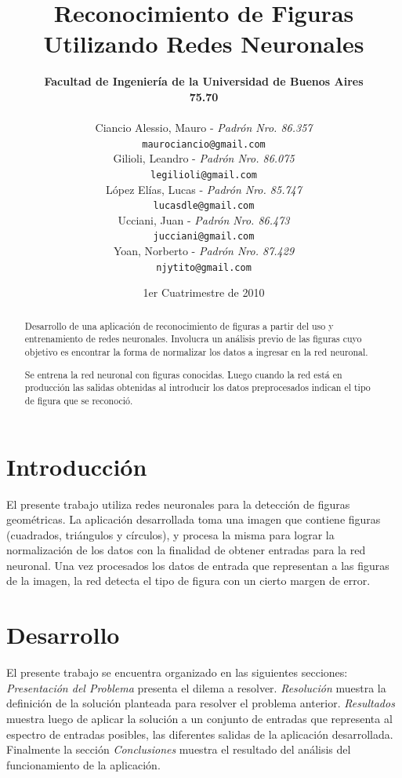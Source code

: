 \documentclass[pdftex,a4paper,12pt]{article}
\title{Reconocimiento de Figuras Utilizando Redes Neuronales}
\author{ \textbf{Facultad de Ingenier\'ia de la Universidad de Buenos Aires}\\
\textbf{75.70} \\ \\ 
Ciancio Alessio, Mauro - \textit{Padr\'on Nro. 86.357} \\
\texttt{maurociancio@gmail.com} \\
Gilioli, Leandro - \textit{Padr\'on Nro. 86.075} \\
\texttt{legilioli@gmail.com} \\
L\'opez El\'ias, Lucas - \textit{Padr\'on Nro. 85.747} \\
\texttt{lucasdle@gmail.com} \\
Ucciani, Juan - \textit{Padr\'on Nro. 86.473} \\
\texttt{jucciani@gmail.com} \\
Yoan, Norberto - \textit{Padr\'on Nro. 87.429} \\
\texttt{njytito@gmail.com} \\[2.5ex]
}
\date{1er Cuatrimestre de 2010}
\begin{document}
\maketitle

\begin{abstract}
	Desarrollo de una aplicaci\'on de reconocimiento de figuras a partir del uso y entrenamiento de redes neuronales. Involucra un an\'alisis previo de las figuras cuyo objetivo es encontrar la forma de normalizar los datos a ingresar en la red neuronal.
	
	Se entrena la red neuronal con figuras conocidas. Luego cuando la red est\'a en producci\'on las salidas obtenidas al introducir los datos preprocesados indican el tipo de figura que se reconoci\'o.
\end{abstract}

\thispagestyle{empty}
\newpage
\tableofcontents
\newpage

\section{Introducci\'on}
El presente trabajo utiliza redes neuronales para la detecci\'on de figuras geom\'etricas. 
La aplicaci\'on desarrollada toma una imagen que contiene figuras (cuadrados, tri\'angulos y c\'irculos), y procesa la misma para lograr la normalizaci\'on de los datos con la finalidad de obtener entradas para la red neuronal. 
Una vez procesados los datos de entrada que representan a las figuras de la imagen, la red detecta el tipo de figura con un cierto margen de error.


\section{Desarrollo}
El presente trabajo se encuentra organizado en las siguientes secciones:
\textit{Presentaci\'on del Problema} presenta el dilema a resolver.
\textit{Resoluci\'on} muestra la definici\'on de la soluci\'on planteada para resolver el problema anterior. 
\textit{Resultados} muestra luego de aplicar la soluci\'on a un conjunto de entradas que representa al espectro de entradas posibles, las diferentes salidas de la aplicaci\'on desarrollada.
Finalmente la secci\'on \textit{Conclusiones} muestra el resultado del an\'alisis del funcionamiento de la aplicaci\'on.

\end{document}
